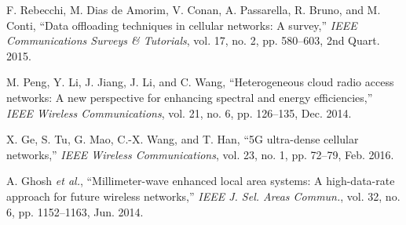 \documentclass[conference]{IEEEtran}
\begin{document}
\begin{thebibliography}{20}
 F. Rebecchi, M. Dias de Amorim, V. Conan, A. Passarella, R. Bruno, and M. Conti, ``Data offloading techniques in cellular networks: A survey,'' \textit{IEEE Communications Surveys \& Tutorials}, vol. 17, no. 2, pp. 580--603, 2nd Quart. 2015.

 M. Peng, Y. Li, J. Jiang, J. Li, and C. Wang, ``Heterogeneous cloud radio access networks: A new perspective for enhancing spectral and energy efficiencies,'' \textit{IEEE Wireless Communications}, vol. 21, no. 6, pp. 126--135, Dec. 2014.

 X. Ge, S. Tu, G. Mao, C.-X. Wang, and T. Han, ``5G ultra-dense cellular networks,'' \textit{IEEE Wireless Communications}, vol. 23, no. 1, pp. 72--79, Feb. 2016.

 A. Ghosh \textit{et al.}, ``Millimeter-wave enhanced local area systems: A high-data-rate approach for future wireless networks,'' \textit{IEEE J. Sel. Areas Commun.}, vol. 32, no. 6, pp. 1152--1163, Jun. 2014.

\end{thebibliography}
\end{document}

